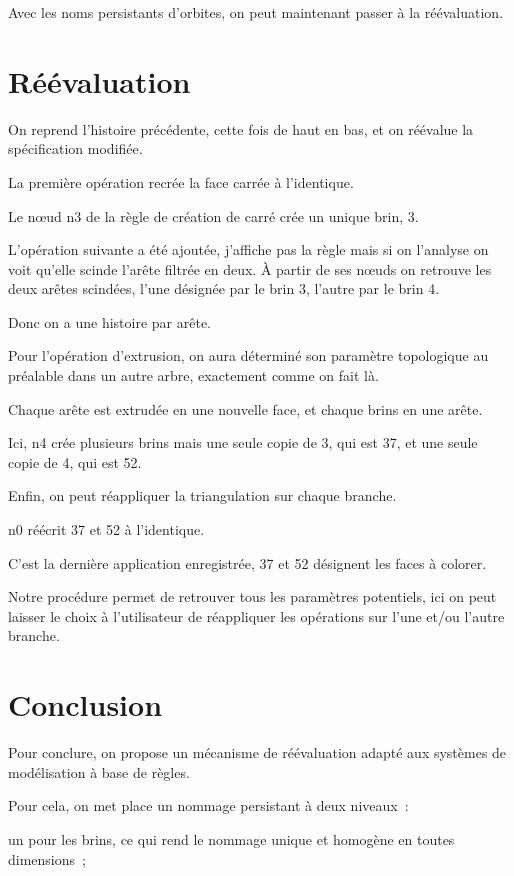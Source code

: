 \documentclass[11pt]{article}
\begin{document}
Avec les noms persistants d'orbites, on peut maintenant passer à la
réévaluation.

\section{Réévaluation}
\label{sec:org3b38850}

On reprend l'histoire précédente, cette fois de haut en bas, et on réévalue la
spécification modifiée. %

La première opération recrée la face carrée à l'identique.

Le nœud n3 de la règle de création de carré crée un unique brin, 3.

L'opération suivante a été ajoutée, j'affiche pas la règle mais si on l'analyse
on voit qu'elle scinde l'arête filtrée en deux. À partir de ses nœuds on
retrouve les deux arêtes scindées, l'une désignée par le brin 3, l'autre par le
brin 4.

Donc on a une histoire par arête. %

Pour l'opération d'extrusion, on aura déterminé son paramètre topologique au
préalable dans un autre arbre, exactement comme on fait là.

Chaque arête est extrudée en une nouvelle face, et chaque brins en une arête.

Ici, n4 crée plusieurs brins mais une seule copie de 3, qui est 37, et une seule
copie de 4, qui est 52.

Enfin, on peut réappliquer la triangulation sur chaque branche.

n0 réécrit 37 et 52 à l'identique.

C'est la dernière application enregistrée, 37 et 52 désignent les faces à
colorer.

Notre procédure permet de retrouver tous les paramètres potentiels, ici on peut
laisser le choix à l'utilisateur de réappliquer les opérations sur l'une et/ou
l'autre branche. %

\section{Conclusion}
\label{sec:orga7a7cfd}

Pour conclure, on propose un mécanisme de réévaluation adapté aux systèmes de
modélisation à base de règles.

Pour cela, on met place un nommage persistant à deux niveaux~:

un pour les brins, ce qui rend le nommage unique et homogène en toutes
dimensions~;
\end{document}
